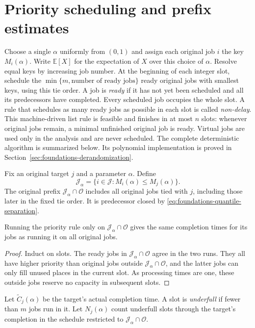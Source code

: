 \section{Priority scheduling and prefix estimates}
\label{sec:foundations-rounding}

Choose a single $\alpha$ uniformly from $(0,1)$ and assign each original
job $i$ the key $M_i(\alpha)$. Write $\mathbb E[X]$ for the expectation of
$X$ over this choice of $\alpha$.
Resolve equal keys by increasing job number. At the beginning of each integer slot,
schedule the $\min\{m,\text{number of ready jobs}\}$ ready original jobs
with smallest keys, using this tie order. A job is \emph{ready} if it has not
yet been scheduled and all its predecessors have completed. Every scheduled
job occupies the whole slot.
A rule that schedules as many ready jobs as possible in each slot is called
\emph{non-delay}. This machine-driven list rule is
feasible and finishes in at most $n$ slots: whenever original jobs remain,
a minimal unfinished original job is ready. Virtual jobs are used only in
the analysis and are never scheduled. The complete deterministic algorithm
is summarized below. Its polynomial implementation is proved in
Section~\ref{sec:foundations-derandomization}.



Fix an original target $j$ and a parameter $\alpha$. Define
\[
 \mathcal J_\alpha=\{i\in\mathcal J:M_i(\alpha)\le M_j(\alpha)\}.
\]
The original prefix $\mathcal J_\alpha\cap\mathcal O$ includes all original jobs tied with
$j$, including those later in the fixed tie order. It is predecessor
closed by \eqref{eq:foundations-quantile-separation}.

\begin{lemma}
Running the priority rule only on $\mathcal J_\alpha\cap\mathcal O$ gives the same completion
times for its jobs as running it on all original jobs.
\end{lemma}
\begin{proof}
Induct on slots. The ready jobs in $\mathcal J_\alpha\cap\mathcal O$ agree in the two runs.
They all have higher priority than original jobs outside $\mathcal J_\alpha\cap\mathcal O$,
and the latter jobs can only fill unused places in the current slot.
As processing times are one, these outside jobs reserve no capacity in
subsequent slots.
\end{proof}

Let $\widetilde C_j(\alpha)$ be the target's actual completion time.
A slot is \emph{underfull} if fewer than $m$ jobs run in it. Let
$N_j(\alpha)$ count underfull slots through the target's completion in
the schedule restricted to $\mathcal J_\alpha\cap\mathcal O$.

